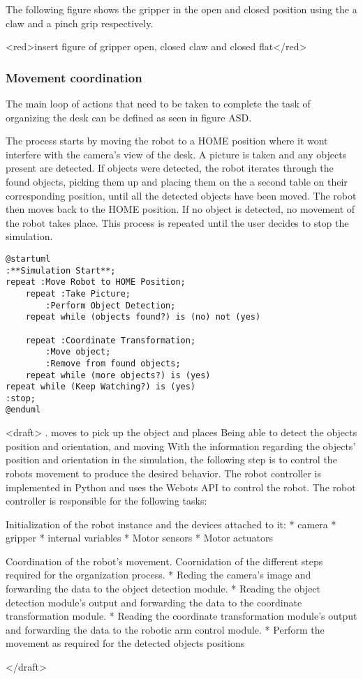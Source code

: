 The following figure shows the gripper in the open and closed position using the a claw and a pinch grip respectively.

<red>insert figure of gripper open, closed claw and closed flat</red>


\subsubsection{Movement coordination}

The main loop of actions that need to be taken to complete the task of organizing the desk can be defined as seen in figure ASD. 

The process starts by moving the robot to a HOME position where it wont interfere with the camera's view of the desk. A picture is taken and any objects present are detected. If objects were detected, the robot iterates through the found objects, picking them up and placing them on the a second table on their corresponding position, until all the detected objects have been moved. The robot then moves back to the HOME position. If no object is detected, no movement of the robot takes place. This process is repeated until the user decides to stop the simulation.

\begin{lstlisting}[]%language=plantuml
@startuml
:**Simulation Start**;
repeat :Move Robot to HOME Position;
    repeat :Take Picture;
        :Perform Object Detection;
    repeat while (objects found?) is (no) not (yes)

    repeat :Coordinate Transformation;
        :Move object;
        :Remove from found objects;
    repeat while (more objects?) is (yes)
repeat while (Keep Watching?) is (yes)
:stop;
@enduml
\end{lstlisting}

<draft>
. moves to pick up the object and places  
Being able to detect the objects position and orientation, and moving 
With the information regarding the objects' position and orientation in the simulation, the following step is to control the robots movement to produce the desired behavior. The robot controller is implemented in Python and uses the Webots API to control the robot. The robot controller is responsible for the following tasks:

Initialization of the robot instance and the devices attached to it: 
* camera
* gripper
* internal variables
* Motor sensors
* Motor actuators

Coordination of the robot's movement.
Coornidation of the different steps required for the organization process.
* Reding the camera's image and forwarding the data to the object detection module.
* Reading the object detection module's output and forwarding the data to the coordinate transformation module.
* Reading the coordinate transformation module's output and forwarding the data to the robotic arm control module.
* Perform the movement as required for the detected objects positions
  
</draft>
